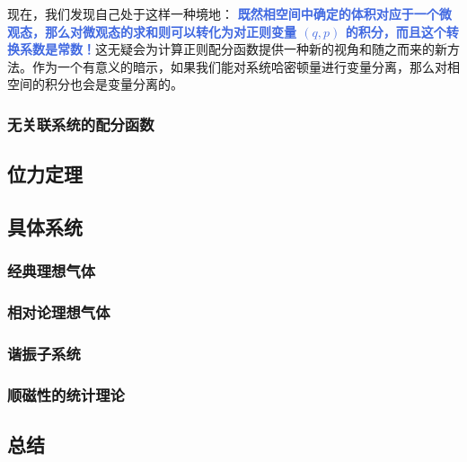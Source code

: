 \documentclass[hyperref,UTF-8]{ctexart}
\newcommand{\0}{\boldsymbol{0}}
\begin{document}
现在，我们发现自己处于这样一种境地： \textcolor{RoyalBlue}{\textbf{\kaishu 既然相空间中确定的体积对应于一个微观态，那么对微观态的求和则可以转化为对正则变量 $(q,p)$ 的积分，而且这个转换系数是常数！}}这无疑会为计算正则配分函数提供一种新的视角和随之而来的新方法。作为一个有意义的暗示，如果我们能对系统哈密顿量进行变量分离，那么对相空间的积分也会是变量分离的。


\subsubsection{无关联系统的配分函数}

\subsection{位力定理}



\subsection{具体系统}

\subsubsection{经典理想气体}

\subsubsection{相对论理想气体}

\subsubsection{谐振子系统}

\subsubsection{顺磁性的统计理论}

\subsection{总结}

\subsection{}
\end{document}
